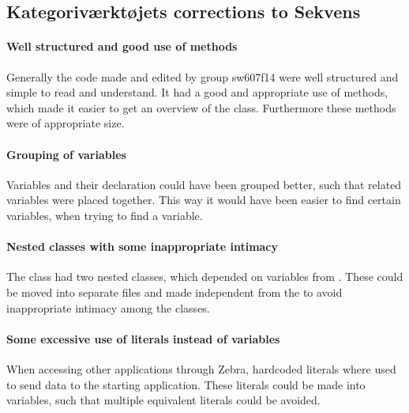 \subsection{Kategoriværktøjets corrections to Sekvens}\label{subsec:collab_sekvenscorrections}

\paragraph{Well structured and good use of methods}
Generally the code made and edited by group sw607f14 were well structured and simple to read and understand. It had a good and appropriate use of methods, which made it easier to get an overview of the class. Furthermore these methods were of appropriate size.

\paragraph{Grouping of variables}
Variables and their declaration could have been grouped better, such that related variables were placed together. This way it would have been easier to find certain variables, when trying to find a variable.

\paragraph{Nested classes with some inappropriate intimacy}
The class  had two nested classes, which depended on variables from . These could be moved into separate files and made independent from the  to avoid inappropriate intimacy among the classes.

\paragraph{Some excessive use of literals instead of variables}
When accessing other applications through Zebra, hardcoded literals where used to send data to the starting application. These literals could be made into variables, such that multiple equivalent literals could be avoided.